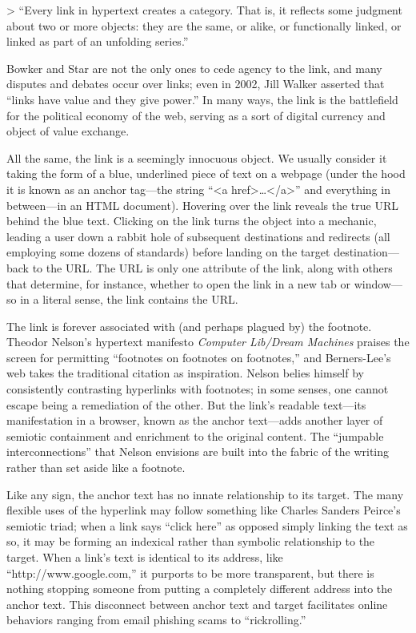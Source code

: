 > ``Every link in hypertext creates a category. That is, it reflects some judgment about two or more objects: they are the same, or alike, or functionally linked, or linked as part of an unfolding series.''\autocite{bowker_star}

\noindent Bowker and Star are not the only ones to cede agency to the link, and many disputes and debates occur over links; even in 2002, Jill Walker asserted that ``links have value and they give power.''\autocite{walker} In many ways, the link is the battlefield for the political economy of the web, serving as a sort of digital currency and object of value exchange.

All the same, the link is a seemingly innocuous object. We usually consider it taking the form of a blue, underlined piece of text on a webpage (under the hood it is known as an anchor tag---the string ``<a href>\ldots</a>'' and everything in between—in an HTML document). Hovering over the link reveals the true URL behind the blue text. Clicking on the link turns the object into a mechanic, leading a user down a rabbit hole of subsequent destinations and redirects (all employing some dozens of standards) before landing on the target destination---back to the URL. The URL is only one attribute of the link, along with others that determine, for instance, whether to open the link in a new tab or window---so in a literal sense, the link contains the URL.

The link is forever associated with (and perhaps plagued by) the footnote. Theodor Nelson's hypertext manifesto \emph{Computer Lib/Dream Machines} praises the screen for permitting ``footnotes on footnotes on footnotes,''\autocite{nelson} and Berners-Lee's web takes the traditional citation as inspiration. Nelson belies himself by consistently contrasting hyperlinks with footnotes; in some senses, one cannot escape being a remediation of the other. But the link's readable text---its manifestation in a browser, known as the anchor text---adds another layer of semiotic containment and enrichment to the original content. The ``jumpable interconnections'' that Nelson envisions are built into the fabric of the writing rather than set aside like a footnote.

Like any sign, the anchor text has no innate relationship to its target. The many flexible uses of the hyperlink may follow something like Charles Sanders Peirce's semiotic triad; when a link says ``click here'' as opposed simply linking the text as so, it may be forming an indexical rather than symbolic relationship to the target. When a link's text is identical to its address, like ``http://www.google.com,'' it purports to be more transparent, but there is nothing stopping someone from putting a completely different address into the anchor text. This disconnect between anchor text and target facilitates online behaviors ranging from email phishing scams to ``rickrolling.''


